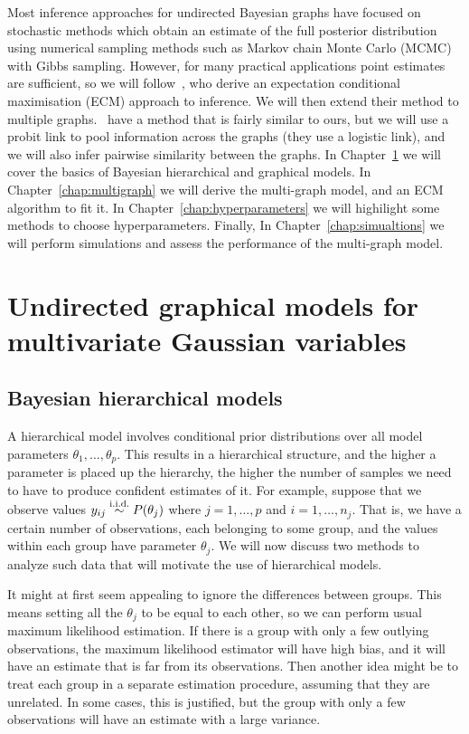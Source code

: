 \documentclass[a4paper, 11pt, oneside]{report}
\newcommand{\iid}{\stackrel{\textmd{i.i.d.}}{\sim}}
\newcommand{\1}{\mathds{1}}
\begin{document}
Most inference approaches for undirected Bayesian graphs have focused on
stochastic methods which obtain an estimate of the full posterior distribution
using numerical sampling methods such as Markov chain Monte Carlo (MCMC) with
Gibbs sampling. However, for many practical applications
point estimates are sufficient, so we will follow~\citet{limcco-2017}, who
derive an expectation conditional maximisation (ECM) approach to inference. We
will then extend their method to multiple graphs.~\citet{luke2017} have a method that is
fairly similar to ours, but we will use a probit link to pool
information across the graphs (they use a logistic link), and we will also infer 
pairwise similarity between the graphs.
In Chapter~\ref{chap:graphs} we will cover the basics of Bayesian hierarchical and graphical models. In Chapter~\ref{chap:multigraph} we will derive the multi-graph model, and an ECM algorithm to fit it. In Chapter~\ref{chap:hyperparameters} we will highilight some methods to choose hyperparameters. Finally, In Chapter~\ref{chap:simualtions} we will perform simulations and assess the performance of the multi-graph model.

\chapter{Undirected graphical models for multivariate Gaussian
  variables}\label{chap:graphs}

\section{Bayesian hierarchical models}
A hierarchical model involves conditional prior distributions over all model parameters
$\theta_1, \dots, \theta_p$. This results in a hierarchical structure, and the
higher a parameter is placed
up the hierarchy, the higher the number of samples we need to have to produce
confident estimates of it.
For example, suppose that we observe values $y_{ij} \iid P(\theta_j)$ where $j=1,\dots,p$ and
$i=1,\dots,n_j$. That is, we have a certain number of observations,
each belonging to some group, and the values within each group have
parameter $\theta_j$. We will now discuss two methods to analyze such data
that will motivate the use of hierarchical models.

It might at first seem appealing to ignore the differences between groups. This
means setting all the $\theta_j$ to be equal to each other, so we can perform
usual maximum likelihood estimation. If there is a group with only a few
outlying observations, the maximum likelihood estimator will have high bias, and it will have an estimate that is far from its observations.
Then another idea might be to treat each group in a separate estimation procedure, assuming
that they are unrelated. In some cases, this is
justified, but the group with only a few
observations will have an estimate with a large variance.
\end{document}
